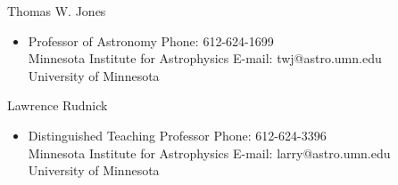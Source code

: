 \documentclass[10pt]{article}
\newenvironment{innerlist}[1][\enskip\textbullet]%
        {\begin{itemize}[#1,leftmargin=*,parsep=0pt,itemsep=0pt,topsep=0pt,partopsep=0pt]}
        {\end{itemize}}
\newcommand{\halfblankline}{\quad\vspace{-0.5\baselineskip}\pagebreak[3]}
\begin{document}
\halfblankline

Thomas W. Jones
\begin{innerlist}
\item[] Professor of Astronomy \hfill {Phone: 612-624-1699}\\
Minnesota Institute for Astrophysics \hfill{E-mail: twj@astro.umn.edu}\\
University of Minnesota
\end{innerlist}

\halfblankline

Lawrence Rudnick
\begin{innerlist}
\item[] Distinguished Teaching Professor \hfill {Phone: 612-624-3396}\\
Minnesota Institute for Astrophysics \hfill{E-mail: larry@astro.umn.edu}\\
University of Minnesota
\end{innerlist}
\end{document}

